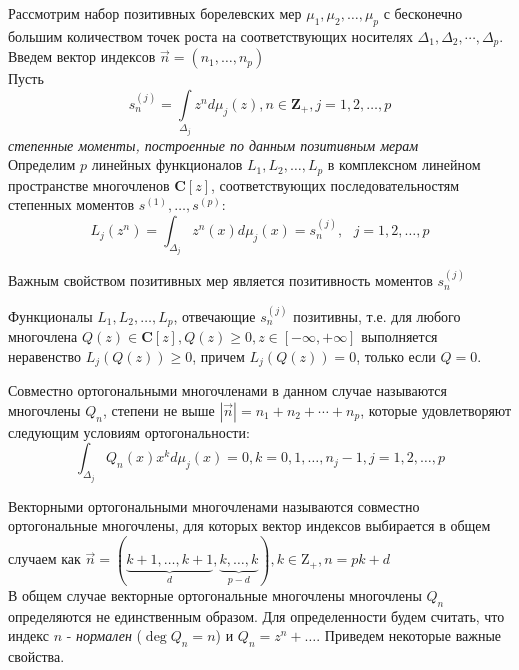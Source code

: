 Рассмотрим набор позитивных борелевских мер
$\mu_1,\mu_2,\ldots,\mu_p$ с бесконечно большим количеством точек
роста на соответствующих носителях
$\Delta_1,\Delta_2,\cdots,\Delta_p$. \\
Введем вектор индексов $\overrightarrow{n}=(n_1,\ldots,n_p)$ \\
Пусть
\begin{equation}
\label{Moments} s_n^{(j)}=\int \limits_{\Delta_j} {z^n d\mu_j
(z)}, n \in \textbf{Z}_{+}, j=1,2,\ldots,p
\end{equation}
\textit{степенные моменты, построенные по данным позитивным
мерам} \\
Определим $p$ линейных функционалов $L_1,L_2,\ldots,L_p$ в
комплексном линейном пространстве многочленов $\textbf{C}[z]$,
соответствующих последовательностям степенных моментов ${s^{(1)}},
\ldots, {s^{(p)}}$:
\begin{equation}
\label{Functionals}
L_j(z^n)=\int_{\Delta_j}{z^n(x)d\mu_j(x)}=s_n^{(j)},\mbox{    }
j=1,2,\ldots,p
\end{equation}
\begin{prope}
Важным свойством позитивных мер является позитивность моментов
$s_n^{(j)}$
\end{prope}
\begin{prope}
Функционалы $L_1,L_2,\ldots,L_p$, отвечающие $s_n^{(j)}$
позитивны, т.е. для любого многочлена $Q(z) \in \textbf{C}[z],
Q(z) \geq 0, z \in [-\infty,+\infty]$ выполняется неравенство
$L_j(Q(z)) \geq 0$, причем $L_j(Q(z))=0$, только если $Q = 0$. \rm
\end{prope}
\begin{defi} Совместно ортогональными многочленами \rm в данном
случае называются многочлены $Q_n$, степени не выше
$|\overrightarrow{n}|=n_1+n_2+\cdots+n_p$, которые удовлетворяют
следующим условиям ортогональности:
\begin{equation}
\label{OrthogonalCondition}
\int_{\Delta_j}{Q_n(x)x^kd\mu_j(x)}=0,\mbox{
}k=0,1,\ldots,n_j-1,j=1,2,\ldots,p
\end{equation}
\end{defi}
\begin{defi} Векторными ортогональными многочленами \rm называются
совместно ортогональные многочлены, для которых вектор индексов
выбирается в общем случаем как
$\overrightarrow{n}=(\underbrace{k+1,\ldots,k+1}_{d},\underbrace{k,\ldots,k}_{p-d}),
k\in{\mbox{Z}}_{+},n=pk+d$ \\
В общем случае векторные ортогональные многочлены многочлены $Q_n$
определяются не единственным образом. Для определенности будем
считать, что индекс $n$ - \textit{нормален} ($\deg  Q_n=n$) и
$Q_n=z^n+\ldots$. Приведем некоторые важные свойства.
\end{defi}
